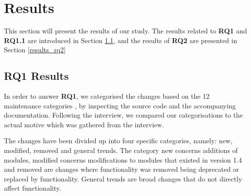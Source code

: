 \documentclass{sig-alternate}
\begin{document}


\section{Results} \label{results}
This section will present the results of our study. The results related to \textbf{RQ1} and \textbf{RQ1.1} are introduced in Section \ref{results_rq1}, and the results of \textbf{RQ2} are presented in Section \ref{results_rq2}



\subsection{RQ1 Results} \label{results_rq1}


In order to answer \textbf{RQ1}, we categorised the changes based on the 12 maintenance categories \cite{chapin2001types}, by inspecting the source code and the accompanying documentation. Following the interview, we compared our categorisations to the actual motive which was gathered from the interview. 

The changes have been divided up into four specific categories, namely: new, modified, removed and general trends. The category new concerns additions of modules, modified concerns modifications to modules that existed in version 1.4 and removed are changes where functionality was removed being deprecated or replaced by functionality. General trends are broad changes that do not directly affect functionality. 
\end{document}
